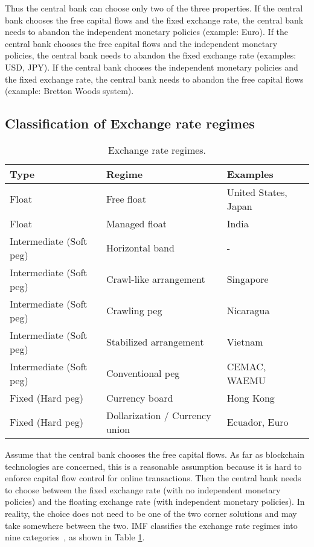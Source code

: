 \documentclass[dvipdfmx,a4paper]{article}
\begin{document}
Thus the central bank can choose only two of the three properties. If the central bank chooses the free capital flows and the fixed exchange rate, the central bank needs to abandon the independent monetary policies (example: Euro). If the central bank chooses the free capital flows and the independent monetary policies, the central bank needs to abandon the fixed exchange rate (examples: USD, JPY). If the central bank chooses the independent monetary policies and the fixed exchange rate, the central bank needs to abandon the free capital flows (example: Bretton Woods system).

\subsection{Classification of Exchange rate regimes}

\begin{table}[tb]
\begin{center}
\caption{Exchange rate regimes.}\vspace{2ex}
\begin{tabular}{lll}\hline
  Type & Regime & Examples\\\hline
  Float & Free float & United States, Japan\\
  Float & Managed float & India\\
  Intermediate (Soft peg) & Horizontal band & -\\
  Intermediate (Soft peg) & Crawl-like arrangement & Singapore\\
  Intermediate (Soft peg) & Crawling peg & Nicaragua\\
  Intermediate (Soft peg) & Stabilized arrangement & Vietnam\\
  Intermediate (Soft peg) & Conventional peg & CEMAC, WAEMU\\
  Fixed (Hard peg) & Currency board & Hong Kong\\
  Fixed (Hard peg) & Dollarization / Currency union & Ecuador, Euro\\\hline
\end{tabular}
\label{exchange_rate_regimes}
\end{center}
\end{table}

Assume that the central bank chooses the free capital flows. As far as blockchain technologies are concerned, this is a reasonable assumption because it is hard to enforce capital flow control for online transactions. Then the central bank needs to choose between the fixed exchange rate (with no independent monetary policies) and the floating exchange rate (with independent monetary policies). In reality, the choice does not need to be one of the two corner solutions and may take somewhere between the two. IMF classifies the exchange rate regimes into nine categories~\cite{imfreport}, as shown in Table \ref{exchange_rate_regimes}.
\end{document}
